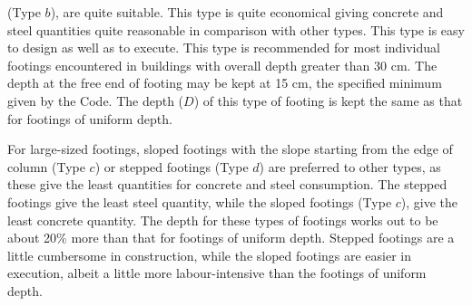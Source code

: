 \documentclass{report}
\begin{document}
(Type $b$), are quite suitable. This type is quite economical giving concrete and steel quantities quite reasonable in comparison with other types. This type is easy to design as well as to execute. This type is recommended for most individual footings encountered in buildings with overall depth greater than 30 cm. The depth at the free end of footing may be kept at 15 cm, the specified minimum given by the Code. The depth ($D$) of this type of footing is kept the same as that for footings of uniform depth.

For large-sized footings, sloped footings with the slope starting from the edge of column
(Type $c$) or stepped footings (Type $d$) are preferred to other types, as these give the least quantities for concrete and steel consumption. The stepped footings give the least steel quantity, while the sloped footings (Type $c$), give the least concrete quantity. The depth for these types of footings works out to be about 20\% more than that for footings of uniform depth. Stepped footings are a little cumbersome in construction, while the sloped footings are easier in execution, albeit a little more labour-intensive than the footings of uniform depth.

\end{document}
